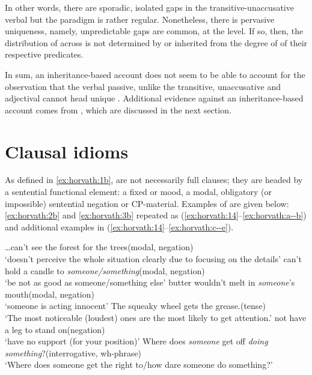 \documentclass[output=paper,
modfonts
]{LSP/langsci}
\begin{document}
In other words, there are sporadic, isolated gaps in the
transitive-unaccusative verbal  but the paradigm is rather
regular. Nonetheless, there is pervasive uniqueness, namely,
unpredictable gaps are common, at the  level. If so, then, the
distribution of  across  is not determined by or
inherited from the degree of  of their respective
predicates.

In sum, an inheritance-based account does not seem to be able to account
for the observation that the verbal passive, unlike the transitive,
unaccusative and adjectival  cannot head unique .
Additional evidence against an inheritance-based account comes from
, which are discussed in the next section.

\section{Clausal idioms}\label{sec:horvath:3}

As defined in \ref{ex:horvath:1b},  are not necessarily full clauses;
they are headed by a sentential functional element: a fixed  or
mood, a modal, obligatory (or impossible) sentential negation or
CP-material. Examples of  are given below: \ref{ex:horvath:2b} and \ref{ex:horvath:3b}
repeated as (\ref{ex:horvath:14}--\ref{ex:horvath:a--b}) and additional examples in (\ref{ex:horvath:14}--\ref{ex:horvath:c--e}).

\ea \label{ex:horvath:14}
	\ea \label{ex:horvath:14a} \ldots{}can't see the forest for the trees\hfill (modal, negation)\\
	`doesn't perceive the whole situation clearly due to focusing on the
	details'
	\ex \label{ex:horvath:14b} can't hold a candle to \emph{someone/something}\hfill(modal, negation)\\
	`be not as good as someone/something else'
		\ex \label{ex:horvath:14c} butter wouldn't melt in \emph{someone}'s mouth\hfill (modal, negation)\\
	`someone is acting innocent'
		\ex \label{ex:horvath:14d} The squeaky wheel gets the grease.\hfill (tense)\\
	 `The most noticeable (loudest) ones are the most likely to get attention.'
	\ex \label{ex:horvath:14e} not have a leg to stand on\hfill (negation)\\
	`have no support (for your position)'
	\ex \label{ex:horvath:14f} Where does \emph{someone} get off \emph{doing something}?\hfill(interrogative, wh-phrase)\\
	`Where does someone get the right to/how dare someone do something?'
	\z
\z
\end{document}
